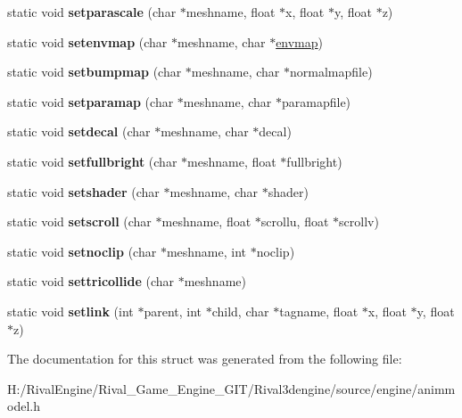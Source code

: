 \begin{DoxyCompactItemize}
static void {\bfseries setparascale} (char $\ast$meshname, float $\ast$x, float $\ast$y, float $\ast$z)
\item 
\mbox{\label{structmodelcommands_a7a58c4c41f98025144b239ad4bcaa1ae}} 
static void {\bfseries setenvmap} (char $\ast$meshname, char $\ast$\hyperlink{structenvmap}{envmap})
\item 
\mbox{\label{structmodelcommands_a53b63127f2f5466d779023836eea03c3}} 
static void {\bfseries setbumpmap} (char $\ast$meshname, char $\ast$normalmapfile)
\item 
\mbox{\label{structmodelcommands_a82d1e29ad6bd24f8cf13eea246802257}} 
static void {\bfseries setparamap} (char $\ast$meshname, char $\ast$paramapfile)
\item 
\mbox{\label{structmodelcommands_a82fa3a1b118566ae066b540e53a56b18}} 
static void {\bfseries setdecal} (char $\ast$meshname, char $\ast$decal)
\item 
\mbox{\label{structmodelcommands_ac656510e56d8caf779b659a9ea76ab2d}} 
static void {\bfseries setfullbright} (char $\ast$meshname, float $\ast$fullbright)
\item 
\mbox{\label{structmodelcommands_a751050395d81ecde50a6220d3e90ab47}} 
static void {\bfseries setshader} (char $\ast$meshname, char $\ast$shader)
\item 
\mbox{\label{structmodelcommands_a234616247c258e30faf2cc35780ef5de}} 
static void {\bfseries setscroll} (char $\ast$meshname, float $\ast$scrollu, float $\ast$scrollv)
\item 
\mbox{\label{structmodelcommands_aea7dc9da933810657695d84377171927}} 
static void {\bfseries setnoclip} (char $\ast$meshname, int $\ast$noclip)
\item 
\mbox{\label{structmodelcommands_a7f282a71228fe586ced06230f08d4e84}} 
static void {\bfseries settricollide} (char $\ast$meshname)
\item 
\mbox{\label{structmodelcommands_af78d62040df1c89981666abd4e840a65}} 
static void {\bfseries setlink} (int $\ast$parent, int $\ast$child, char $\ast$tagname, float $\ast$x, float $\ast$y, float $\ast$z)
\end{DoxyCompactItemize}


The documentation for this struct was generated from the following file\+:\begin{DoxyCompactItemize}
\item 
H\+:/\+Rival\+Engine/\+Rival\+\_\+\+Game\+\_\+\+Engine\+\_\+\+G\+I\+T/\+Rival3dengine/source/engine/animmodel.\+h\end{DoxyCompactItemize}
